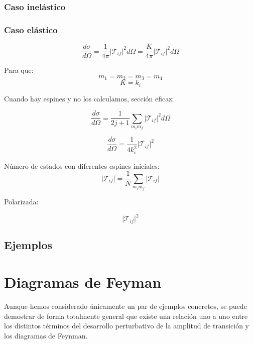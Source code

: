 \subsubsection{Caso inelástico}
\subsubsection{Caso elástico}
$$
\frac{d\sigma}{d\Omega} = \frac{1}{4\pi} \left| \mathcal{T}_{if} \right|^2 d\Omega = \frac{K}{4\pi} \left| \mathcal{T}_{if} \right|^2 d\Omega
$$

Para que:
$$
m_1 = m_2 = m_3 = m_4
$$
$$
K = k_i
$$

Cuando hay espines y no los calculamos, sección eficaz:

$$
\frac{d\sigma}{d\Omega} = \frac{1}{2j+1} \sum_{m_i m_f} \left| \mathcal{T}_{if} \right|^2 d\Omega
$$

$$
\frac{d\sigma}{d\Omega} = \frac{1}{4 k_i^2} \left| \mathcal{T}_{if} \right|^2
$$

Número de estados con diferentes espines iniciales:
$$
\left| \mathcal{T}_{if} \right| = \frac{1}{N} \sum_{m_i m_f} \left| \mathcal{T}_{if} \right|
$$

Polarizada:

$$
\left| \mathcal{T}_{if} \right|^2
$$
\subsection{Ejemplos}
\section{Diagramas de Feyman}
Aunque hemos considerado únicamente un par de ejemplos concretos, se puede demostrar de forma totalmente general que existe una relación uno a uno entre los distintos términos del desarrollo perturbativo de la amplitud de transición y los diagramas de Feynman.

